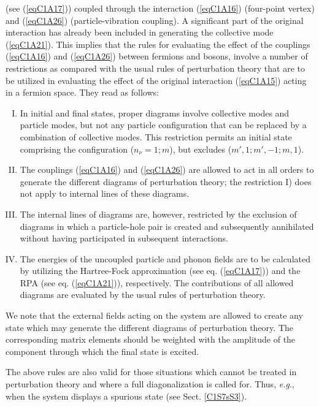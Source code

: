 (see (\ref{eqC1A17})) coupled through the interaction (\ref{eqC1A16}) (four-point vertex) and (\ref{eqC1A26}) (particle-vibration coupling). A significant
part of the original interaction has already been included in generating the
collective mode (\ref{eqC1A21}). This implies that the rules for evaluating the effect of
the couplings (\ref{eqC1A16}) and (\ref{eqC1A26}) between fermions and bosons, involve a number of restrictions as compared with the usual rules of perturbation theory  that
are to be utilized in evaluating the effect of the original interaction (\ref{eqC1A15}) acting
in a fermion space. They read as follows:
\begin{enumerate}[I)]
\item In initial and final states, proper diagrams involve collective modes
and particle modes, but not any particle configuration that can be replaced by
a combination of collective modes. This restriction permits an initial state
comprising the configuration ($n_\nu =1;m$), but excludes ($m', 1; m',-1; m,1$).
\item The couplings (\ref{eqC1A16}) and (\ref{eqC1A26}) are allowed to act in all orders to
generate the different diagrams of perturbation theory; the restriction I) does
not apply to internal lines of these diagrams.
\item The internal lines of diagrams are, however, restricted by the exclusion of diagrams in which a particle-hole pair is created and subsequently
annihilated without having participated in subsequent interactions.
\item The energies of the uncoupled particle and phonon fields are to be
calculated by utilizing the Hartree-Fock approximation (see eq. (\ref{eqC1A17})) and the
RPA (see eq. (\ref{eqC1A21})), respectively. The contributions of all allowed diagrams are
evaluated by the usual rules of perturbation theory.
\end{enumerate}

We note that the external fields acting on the system are allowed to create
any state which may generate the different diagrams of perturbation theory.
The corresponding matrix elements should be weighted with the amplitude of
the component through which the final state is excited.



The above rules are also valid for those situations which cannot be treated
in perturbation theory and where a full diagonalization is called for. Thus,
\textit{e.g}., when the system displays a spurious state (see Sect. \ref{C1S7sS3}).



